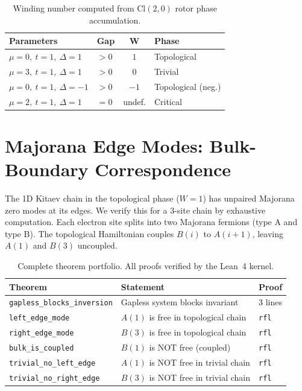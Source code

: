 \documentclass[11pt,a4paper]{article}
\newcommand{\Cl}[1]{\mathrm{Cl}(#1)}
\begin{document}
\begin{table}[h]
\centering
\begin{tabular}{llcl}
\toprule
\textbf{Parameters} & \textbf{Gap} & $\boldsymbol{W}$ & \textbf{Phase} \\
\midrule
$\mu=0,\ t=1,\ \Delta=1$ & $> 0$ & $1$ & Topological \\
$\mu=3,\ t=1,\ \Delta=1$ & $> 0$ & $0$ & Trivial \\
$\mu=0,\ t=1,\ \Delta=-1$ & $> 0$ & $-1$ & Topological (neg.) \\
$\mu=2,\ t=1,\ \Delta=1$ & $= 0$ & undef. & Critical \\
\bottomrule
\end{tabular}
\caption{Winding number computed from $\Cl{2,0}$ rotor phase accumulation.}
\label{tab:winding}
\end{table}

\section{Majorana Edge Modes: Bulk-Boundary Correspondence}

The 1D Kitaev chain in the topological phase ($W=1$) has unpaired Majorana zero modes at its edges. We verify this for a 3-site chain by exhaustive computation. Each electron site splits into two Majorana fermions (type A and type B). The topological Hamiltonian couples $B(i)$ to $A(i+1)$, leaving $A(1)$ and $B(3)$ uncoupled.

\begin{table}[h]
\centering
\begin{tabular}{lll}
\toprule
\textbf{Theorem} & \textbf{Statement} & \textbf{Proof} \\
\midrule
\texttt{gapless\_blocks\_inversion} & Gapless system blocks invariant & 3 lines \\
\texttt{left\_edge\_mode} & $A(1)$ is free in topological chain & \texttt{rfl} \\
\texttt{right\_edge\_mode} & $B(3)$ is free in topological chain & \texttt{rfl} \\
\texttt{bulk\_is\_coupled} & $B(1)$ is NOT free (coupled) & \texttt{rfl} \\
\texttt{trivial\_no\_left\_edge} & $A(1)$ is NOT free in trivial chain & \texttt{rfl} \\
\texttt{trivial\_no\_right\_edge} & $B(3)$ is NOT free in trivial chain & \texttt{rfl} \\
\bottomrule
\end{tabular}
\caption{Complete theorem portfolio. All proofs verified by the Lean~4 kernel.}
\label{tab:theorems}
\end{table}
\end{document}
